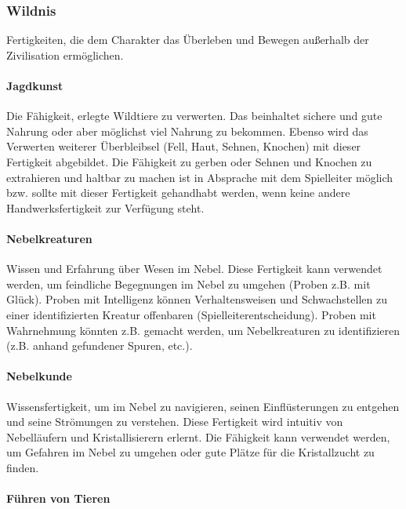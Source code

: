 \documentclass{article}
\begin{document}
\subsubsection{Wildnis}

Fertigkeiten, die dem Charakter das Überleben und Bewegen außerhalb der Zivilisation ermöglichen.

\paragraph{Jagdkunst}

Die Fähigkeit, erlegte Wildtiere zu verwerten. Das beinhaltet sichere und gute Nahrung oder aber möglichst viel
Nahrung zu bekommen. Ebenso wird das Verwerten weiterer Überbleibsel (Fell, Haut, Sehnen, Knochen) mit dieser
Fertigkeit abgebildet. Die Fähigkeit zu gerben oder Sehnen und Knochen zu extrahieren und haltbar zu machen ist
in Absprache mit dem Spielleiter möglich bzw. sollte mit dieser Fertigkeit gehandhabt werden, wenn keine andere
Handwerksfertigkeit zur Verfügung steht.

\paragraph{Nebelkreaturen}

Wissen und Erfahrung über Wesen im Nebel. Diese Fertigkeit kann verwendet werden, um feindliche Begegnungen im Nebel
zu umgehen (Proben z.B. mit Glück). Proben mit Intelligenz können Verhaltensweisen und Schwachstellen zu einer
identifizierten Kreatur offenbaren (Spielleiterentscheidung). Proben mit Wahrnehmung könnten z.B. gemacht werden, um
Nebelkreaturen zu identifizieren (z.B. anhand gefundener Spuren, etc.).

\paragraph{Nebelkunde}

Wissensfertigkeit, um im Nebel zu navigieren, seinen Einflüsterungen zu entgehen und seine Strömungen zu verstehen. Diese
Fertigkeit wird intuitiv von Nebelläufern und Kristallisierern erlernt. Die Fähigkeit kann verwendet werden, um
Gefahren im Nebel zu umgehen oder gute Plätze für die Kristallzucht zu finden.

\paragraph{Führen von Tieren}
\end{document}
